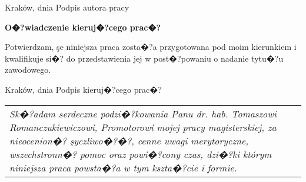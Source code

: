\documentclass[12pt,a4paper]{mwrep}
\begin{document}
\vspace{2cm}
\begin{flushleft}
Kraków, dnia \hfill Podpis autora pracy
\end{flushleft}

\vspace{5cm}
\begin{flushleft}
\textbf{\large O�?wiadczenie kieruj�?cego prac�?}
\end{flushleft}

Potwierdzam, şe niniejsza praca zosta�?a przygotowana 
pod moim kierunkiem i kwalifikuje si�? do przedstawienia jej
w post�?powaniu o nadanie tytu�?u zawodowego.

\vspace{2cm}
\begin{flushleft}
Kraków, dnia  \hfill Podpis kieruj�?cego prac�?
\end{flushleft}


\newpage


\thispagestyle{empty}

\hbox{}\vfill
\begin{flushright}
\begin{tabular}{p{9 cm}}
\textsl{Sk�?adam serdeczne podzi�?kowania Panu dr. hab. 
Tomaszowi Romanczukiewiczowi, Promotorowi mojej pracy magisterskiej,
za nieocenion�? şyczliwo�?�?, cenne uwagi merytoryczne, wszechstronn�?
pomoc oraz powi�?cony czas, dzi�?ki którym niniejsza praca powsta�?a w 
tym kszta�?cie i formie.}
\end{tabular}
\end{flushright}

\end{document}
